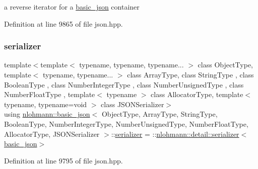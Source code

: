a reverse iterator for a \hyperlink{classnlohmann_1_1basic__json}{basic\+\_\+json} container 



Definition at line 9865 of file json.\+hpp.

\mbox{\label{classnlohmann_1_1basic__json_a68557c31b3bdf31c12e148baecec0d23}} 
\subsubsection{\texorpdfstring{serializer}{serializer}}
{\footnotesize\ttfamily template$<$template$<$ typename, typename, typename... $>$ class Object\+Type, template$<$ typename, typename... $>$ class Array\+Type, class String\+Type , class Boolean\+Type , class Number\+Integer\+Type , class Number\+Unsigned\+Type , class Number\+Float\+Type , template$<$ typename $>$ class Allocator\+Type, template$<$ typename, typename=void $>$ class J\+S\+O\+N\+Serializer$>$ \\
using \hyperlink{classnlohmann_1_1basic__json}{nlohmann\+::basic\+\_\+json}$<$ Object\+Type, Array\+Type, String\+Type, Boolean\+Type, Number\+Integer\+Type, Number\+Unsigned\+Type, Number\+Float\+Type, Allocator\+Type, J\+S\+O\+N\+Serializer $>$\+::\hyperlink{classnlohmann_1_1basic__json_a68557c31b3bdf31c12e148baecec0d23}{serializer} =  \+::\hyperlink{classnlohmann_1_1detail_1_1serializer}{nlohmann\+::detail\+::serializer}$<$\hyperlink{classnlohmann_1_1basic__json}{basic\+\_\+json}$>$\hspace{0.3cm}{\ttfamily [private]}}



Definition at line 9795 of file json.\+hpp.

\mbox{\label{classnlohmann_1_1basic__json_a39f2cd0b58106097e0e67bf185cc519b}} 
